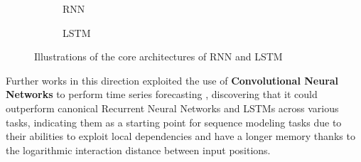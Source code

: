 \documentclass[../thesis.tex]{subfiles}
\begin{document}
\newsavebox{\largestimage}
\begin{figure}
    \centering
    \begin{subfigure}[b]{0.4\textwidth}
        \centering
        \usebox{\largestimage}
        \caption{RNN}
        \label{fig:diagram_rnn}
    \end{subfigure}
    \quad
    \begin{subfigure}[b]{0.5\textwidth}
        \centering
        \caption{LSTM}
        \label{fig:diagram_lstm}
    \end{subfigure}
    \caption{Illustrations of the core architectures of RNN and LSTM}
    \label{fig:diagrams_rnn_lstm}
\end{figure}

Further works in this direction exploited the use of \textbf{Convolutional Neural Networks} to perform time series forecasting \citep{bai2018temporalconvolution}, discovering that it could outperform canonical Recurrent Neural Networks and LSTMs across various tasks, indicating them as a starting point for sequence modeling tasks due to their abilities to exploit local dependencies and have a longer memory thanks to the logarithmic interaction distance between input positions.
\end{document}
